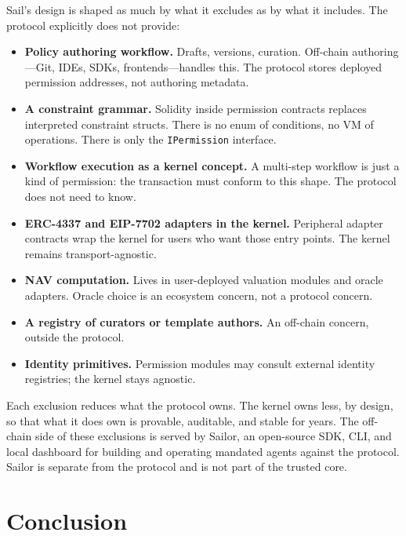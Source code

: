 \documentclass[11pt]{article}
\begin{document}
Sail's design is shaped as much by what it excludes as by what it includes. The protocol explicitly does not provide:

\begin{itemize}
  \itemsep0.15em
  \item \textbf{Policy authoring workflow.} Drafts, versions, curation. Off-chain authoring---Git, IDEs, SDKs, frontends---handles this. The protocol stores deployed permission addresses, not authoring metadata.
  \item \textbf{A constraint grammar.} Solidity inside permission contracts replaces interpreted constraint structs. There is no enum of conditions, no VM of operations. There is only the \texttt{IPermission} interface.
  \item \textbf{Workflow execution as a kernel concept.} A multi-step workflow is just a kind of permission: the transaction must conform to this shape. The protocol does not need to know.
  \item \textbf{ERC-4337 and EIP-7702 adapters in the kernel.} Peripheral adapter contracts wrap the kernel for users who want those entry points. The kernel remains transport-agnostic.
  \item \textbf{NAV computation.} Lives in user-deployed valuation modules and oracle adapters. Oracle choice is an ecosystem concern, not a protocol concern.
  \item \textbf{A registry of curators or template authors.} An off-chain concern, outside the protocol.
  \item \textbf{Identity primitives.} Permission modules may consult external identity registries; the kernel stays agnostic.
\end{itemize}

Each exclusion reduces what the protocol owns. The kernel owns less, by design, so that what it does own is provable, auditable, and stable for years. The off-chain side of these exclusions is served by Sailor, an open-source SDK, CLI, and local dashboard for building and operating mandated agents against the protocol. Sailor is separate from the protocol and is not part of the trusted core.

\section{Conclusion}
\end{document}
